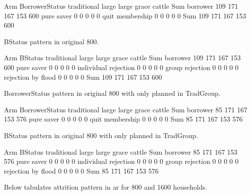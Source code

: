 \begin{Schunk}
\begin{Soutput}
                 Arm
BorrowerStatus    traditional large large grace cattle Sum
  borrower                109   171         167    153 600
  pure saver                0     0           0      0   0
  quit membership           0     0           0      0   0
  Sum                     109   171         167    153 600
\end{Soutput}
\end{Schunk}
\textsf{BStatus} pattern in original 800.
\begin{Schunk}
\begin{Soutput}
                      Arm
BStatus                traditional large large grace cattle Sum
  borrower                     109   171         167    153 600
  pure saver                     0     0           0      0   0
  individual rejection           0     0           0      0   0
  group rejection                0     0           0      0   0
  rejection by flood             0     0           0      0   0
  Sum                          109   171         167    153 600
\end{Soutput}
\end{Schunk}
\textsf{BorrowerStatus} pattern in original 800 with only \textsf{planned} in \textsf{TradGroup}.
\begin{Schunk}
\begin{Soutput}
                 Arm
BorrowerStatus    traditional large large grace cattle Sum
  borrower                 85   171         167    153 576
  pure saver                0     0           0      0   0
  quit membership           0     0           0      0   0
  Sum                      85   171         167    153 576
\end{Soutput}
\end{Schunk}
\textsf{BStatus} pattern in original 800 with only \textsf{planned} in \textsf{TradGroup}.
\begin{Schunk}
\begin{Soutput}
                      Arm
BStatus                traditional large large grace cattle Sum
  borrower                      85   171         167    153 576
  pure saver                     0     0           0      0   0
  individual rejection           0     0           0      0   0
  group rejection                0     0           0      0   0
  rejection by flood             0     0           0      0   0
  Sum                           85   171         167    153 576
\end{Soutput}
\end{Schunk}
Below tabulates attrition pattern in \textsf{ar} for 800 and 1600 households.



